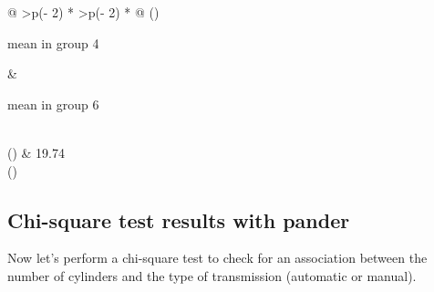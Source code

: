 \documentclass[
]{book}
\newenvironment{Shaded}{\begin{snugshade}}{\end{snugshade}}
\newcommand{\AttributeTok}[1]{\textcolor[rgb]{0.77,0.63,0.00}{#1}}
\newcommand{\FunctionTok}[1]{\textcolor[rgb]{0.00,0.00,0.00}{#1}}
\newcommand{\NormalTok}[1]{#1}
\newcommand{\OtherTok}[1]{\textcolor[rgb]{0.56,0.35,0.01}{#1}}
\newcommand{\SpecialCharTok}[1]{\textcolor[rgb]{0.00,0.00,0.00}{#1}}
\newcommand{\StringTok}[1]{\textcolor[rgb]{0.31,0.60,0.02}{#1}}
\begin{document}
\begin{longtable}[]{@{}
  >{\centering\arraybackslash}p{(\columnwidth - 2\tabcolsep) * }
  >{\centering\arraybackslash}p{(\columnwidth - 2\tabcolsep) * }@{}}
\toprule()
\begin{minipage}[b]{\linewidth}\centering
mean in group 4
\end{minipage} & \begin{minipage}[b]{\linewidth}\centering
mean in group 6
\end{minipage} \\
\midrule()
 & 19.74 \\
\bottomrule()
\end{longtable}

\hypertarget{chi-square-test-results-with-pander}{%
\subsection{Chi-square test results with pander}\label{chi-square-test-results-with-pander}}

Now let's perform a chi-square test to check for an association between the number of cylinders and the type of transmission (automatic or manual).

\begin{Shaded}
\end{Shaded}
\end{document}
